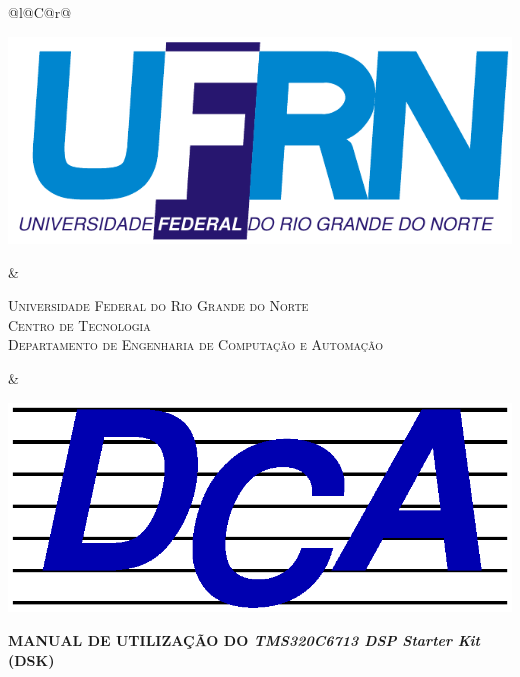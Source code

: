 \documentclass[a4paper, 12pt]{article}
\begin{document}

\begin{titlepage}
	
	\small
	\begin{tabularx}{\linewidth}{@{}l@{}C@{}r@{}}
		\parbox[c]{2cm}{\includegraphics[width=\linewidth]{UFRN}} &
		\begin{center}
			\textsf{\textsc{Universidade Federal do Rio Grande do Norte\\
					Centro de Tecnologia\\
					Departamento de Engenharia de Computação e Automação}}
		\end{center} &
		\parbox[c]{2cm}{\includegraphics[width=\linewidth]{DCA}}
	\end{tabularx}
    
    \vspace{3,5cm}
	\vfill
	\begin{center}
		  \textbf{\LARGE{MANUAL DE UTILIZAÇÃO DO \textit{TMS320C6713 DSP Starter Kit} (DSK)}}\\
		  
	\end{center}
	

\end{titlepage}
\end{document}
